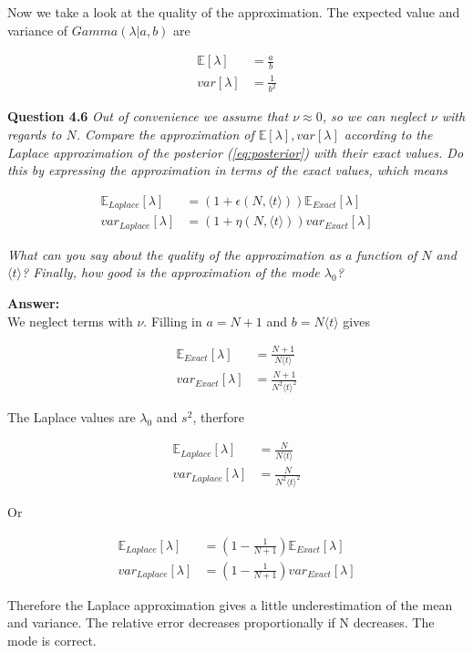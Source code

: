 \documentclass[a4paper]{article}
\begin{document}
Now we take a look at the quality of the approximation. The expected value and variance of $Gamma(\lambda | a, b)$ are

\begin{align*}
	\mathbb{E}[\lambda] &= \frac{a}{b}\\
	var[\lambda] &= \frac{1}{b^2}
\end{align*}

\textbf{Question 4.6}  \textit{Out of convenience we assume that $\nu \approx 0$, so we can neglect $\nu$ with regards to $N$. Compare the approximation of $\mathbb{E}[\lambda], var[\lambda]$ according to the Laplace approximation of the posterior (\ref{eq:posterior}) with their exact values. Do this by expressing the approximation in terms of the exact values, which means}

\begin{align*}
\mathbb{E}_{Laplace}[\lambda] &= (1 + \epsilon (N, \langle t \rangle) )  \mathbb{E}_{Exact}[\lambda]\\
var_{Laplace}[\lambda] &= (1 + \eta (N, \langle t \rangle) )  var_{Exact}[\lambda]
\end{align*} 

\textit{What can you say about the quality of the approximation as a function of $N$ and $\langle t \rangle$? Finally, how good is the approximation of the mode $\lambda_0$?}

\textbf{Answer:}\\

We neglect terms with $\nu$. Filling in $a = N + 1$ and $b = N  \langle t \rangle$ gives

\begin{align*}
\mathbb{E}_{Exact}[\lambda] &= \frac{N + 1}{N \langle t \rangle}\\
var_{Exact}[\lambda] &= \frac{N + 1}{N^2 \langle t \rangle^2}
\end{align*}

The Laplace values are $\lambda_0$ and $s^2$, therfore

\begin{align*}
	\mathbb{E}_{Laplace}[\lambda] &= \frac{N}{N \langle t \rangle}\\
	var_{Laplace}[\lambda] &= \frac{N}{N^2 \langle t \rangle^2}
\end{align*}

Or

\begin{align*}
	\mathbb{E}_{Laplace}[\lambda] &= (1 - \frac{1}{N + 1}) \mathbb{E}_{Exact}[\lambda]\\
	var_{Laplace}[\lambda] &= (1 - \frac{1}{N + 1}) var_{Exact}[\lambda]
\end{align*}

Therefore the Laplace approximation gives a little underestimation of the mean and variance. The relative error decreases proportionally if N decreases. The mode is correct.
\end{document}
